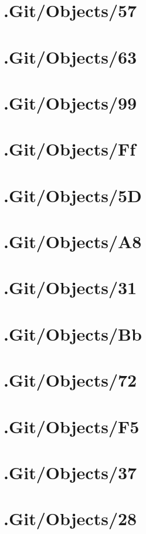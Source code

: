 \section*{.Git/Objects/57}

\section*{.Git/Objects/63}

\section*{.Git/Objects/99}

\section*{.Git/Objects/Ff}

\section*{.Git/Objects/5D}

\section*{.Git/Objects/A8}

\section*{.Git/Objects/31}

\section*{.Git/Objects/Bb}

\section*{.Git/Objects/72}

\section*{.Git/Objects/F5}

\section*{.Git/Objects/37}

\section*{.Git/Objects/28}

